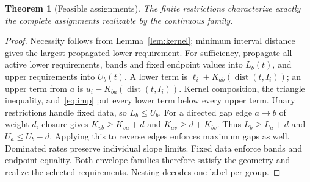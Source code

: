 \documentclass[10pt,letterpaper]{article}
\newtheorem{theorem}{Theorem}
\newcommand{\dist}{\operatorname{dist}}
\begin{document}
\begin{samepage}
\begin{theorem}[Feasible assignments]\label{thm:feas}
The finite restrictions characterize exactly the complete assignments realizable by the continuous family.
\end{theorem}
\end{samepage}
\begin{proof}
Necessity follows from Lemma~\ref{lem:kernel}; minimum interval distance gives the largest propagated lower requirement. For sufficiency, propagate all active lower requirements, bands and fixed endpoint values into $L_b(t)$, and upper requirements into $U_b(t)$. A lower term is $\ell_i+K_{ab}(\dist(t,I_i))$; an upper term from $a$ is $u_i-K_{ba}(\dist(t,I_i))$. Kernel composition, the triangle inequality, and~\eqref{eq:imp} put every lower term below every upper term. Unary restrictions handle fixed data, so $L_b\le U_b$.
For a directed gap edge $a\to b$ of weight $d$, closure gives $K_{vb}\ge K_{va}+d$ and $K_{av}\ge d+K_{bv}$. Thus $L_b\ge L_a+d$ and $U_a\le U_b-d$. Applying this to reverse edges enforces maximum gaps as well. Dominated rates preserve individual slope limits. Fixed data enforce bands and endpoint equality. Both envelope families therefore satisfy the geometry and realize the selected requirements. Nesting decodes one label per group.
\end{proof}
\end{document}
